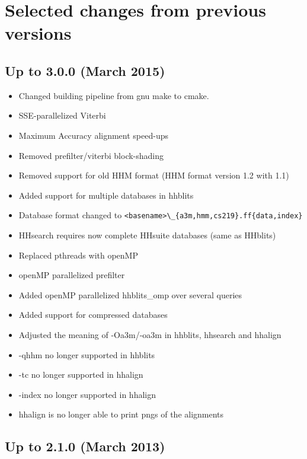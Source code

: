 \documentclass[11pt,a4paper]{article}
\begin{document}
\section{Selected changes from previous versions}


\subsection{Up to 3.0.0  (March 2015)}

\begin{itemize}
\item Changed building pipeline from gnu make to cmake.
\item SSE-parallelized Viterbi
\item Maximum Accuracy alignment speed-ups
\item Removed prefilter/viterbi block-shading
\item Removed support for old HHM format (HHM format version 1.2 with 1.1)
\item Added support for multiple databases in hhblits
\item Database format changed to \verb`<basename>\_{a3m,hmm,cs219}.ff{data,index}`
\item HHsearch requires now complete HHsuite databases (same as HHblits)
\item Replaced pthreads with openMP
\item openMP parallelized prefilter
\item Added openMP parallelized hhblits\_omp over several queries
\item Added support for compressed databases
\item Adjusted the meaning of -Oa3m/-oa3m in hhblits, hhsearch and hhalign
\item -qhhm no longer supported in hhblits
\item -tc no longer supported in hhalign
\item -index no longer supported in hhalign
\item hhalign is no longer able to print pngs of the alignments
\end{itemize}


\subsection{Up to 2.1.0  (March 2013)}
\end{document}
